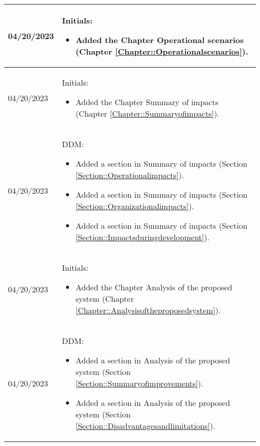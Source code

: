 \begin{longtable}{|l||p{13.5cm}|}
04/20/2023 & Initials:
 \begin{itemize}[topsep=0pt,itemsep=0pt,parsep=0pt,partopsep=0pt,leftmargin=12pt]
 \item Added the Chapter Operational scenarios (Chapter \ref{Chapter::Operationalscenarios}). 
 \end{itemize} 
\\ \hline



04/20/2023 & Initials:
 \begin{itemize}[topsep=0pt,itemsep=0pt,parsep=0pt,partopsep=0pt,leftmargin=12pt]
 \item Added the Chapter Summary of impacts (Chapter \ref{Chapter::Summaryofimpacts}). 
 \end{itemize} 
\\ \hline


04/20/2023 & DDM:
\begin{itemize}[topsep=0pt,itemsep=0pt,parsep=0pt,partopsep=0pt,leftmargin=12pt]
\item Added a section in Summary of impacts (Section \ref{Section::Operationalimpacts}).

\item Added a section in Summary of impacts (Section \ref{Section::Organizationalimpacts}).

\item Added a section in Summary of impacts (Section \ref{Section::Impactsduringdevelopment}).
\end{itemize} 
\\ \hline

04/20/2023 & Initials:
 \begin{itemize}[topsep=0pt,itemsep=0pt,parsep=0pt,partopsep=0pt,leftmargin=12pt]
 \item Added the Chapter Analysis of the proposed system (Chapter \ref{Chapter::Analysisoftheproposedsystem}). 
 \end{itemize} 
\\ \hline


04/20/2023 & DDM:
\begin{itemize}[topsep=0pt,itemsep=0pt,parsep=0pt,partopsep=0pt,leftmargin=12pt]
\item Added a section in Analysis of the proposed system (Section \ref{Section::Summaryofimprovements}).

\item Added a section in Analysis of the proposed system (Section \ref{Section::Disadvantagesandlimitations}).


\end{itemize}
\end{longtable}
